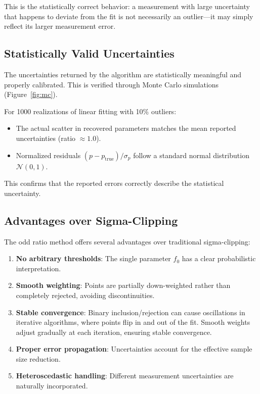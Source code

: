 \documentclass[twocolumn]{aastex631}
\begin{document}
This is the statistically correct behavior: a measurement with large uncertainty that
happens to deviate from the fit is not necessarily an outlier---it may simply reflect
its larger measurement error.


\subsection{Statistically Valid Uncertainties}
\label{sec:validation}

The uncertainties returned by the algorithm are statistically meaningful and properly
calibrated. This is verified through Monte Carlo simulations (Figure~\ref{fig:mc}).

For 1000 realizations of linear fitting with 10\% outliers:
\begin{itemize}
    \item The actual scatter in recovered parameters matches the mean reported
          uncertainties (ratio $\approx 1.0$).
    \item Normalized residuals $(p - p_{\mathrm{true}})/\sigma_p$ follow a standard
          normal distribution $\mathcal{N}(0,1)$.
\end{itemize}

This confirms that the reported errors correctly describe the statistical uncertainty.


\subsection{Advantages over Sigma-Clipping}
\label{sec:advantages}

The odd ratio method offers several advantages over traditional sigma-clipping:

\begin{enumerate}
    \item \textbf{No arbitrary thresholds}: The single parameter $f_0$ has a clear
          probabilistic interpretation.
    \item \textbf{Smooth weighting}: Points are partially down-weighted rather than
          completely rejected, avoiding discontinuities.
    \item \textbf{Stable convergence}: Binary inclusion/rejection can cause oscillations
          in iterative algorithms, where points flip in and out of the fit. Smooth
          weights adjust gradually at each iteration, ensuring stable convergence.
    \item \textbf{Proper error propagation}: Uncertainties account for the effective
          sample size reduction.
    \item \textbf{Heteroscedastic handling}: Different measurement uncertainties are
          naturally incorporated.
\end{enumerate}
\end{document}
